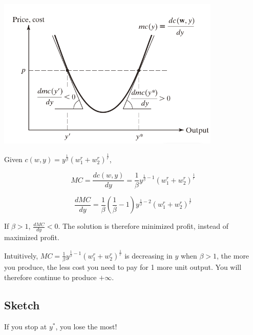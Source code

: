 \documentclass{article}
\begin{document}
\begin{mdframed}[backgroundcolor=blue!20,linecolor=white]
\vspace{2mm}
{\centering
\includegraphics[width=0.8\textwidth]{5.mc}
\label{fig:mc}}
\vspace{2mm}

\end{mdframed}

Given $c(w,y) = y^{\frac{1}{\beta}}{(w_1^r + w_2^r)^{\frac{1}{r}}} $,

$$MC=\frac{dc(w,y)}{dy}= \frac{1}{\beta}  y^{\frac{1}{\beta} - 1}{(w_1^r + w_2^r)^{\frac{1}{r}}}$$

$$\frac{d MC}{dy} = \frac{1}{\beta}(\frac{1}{\beta} - 1)  y^{\frac{1}{\beta} - 2}{(w_1^r + w_2^r)^{\frac{1}{r}}}$$


If $\beta >1$, $\frac{d MC}{dy} < 0$. The solution is therefore minimized profit, instead of maximized profit.

\begin{mdframed}[backgroundcolor=blue!20,linecolor=white]
Intuitively, $MC=\frac{1}{\beta}  y^{\frac{1}{\beta} - 1}{(w_1^r + w_2^r)^{\frac{1}{r}}}$ is decreasing in $y$ when $\beta > 1$, the more you produce, the less cost you need to pay for 1 more unit output. You will therefore continue to produce $+\infty$.

\end{mdframed}

\subsection{Sketch}

\begin{center}
\label{fig:mc}
\end{center}
\vspace{2mm}

If you stop at $y^*$, you lose the most!
\end{document}
